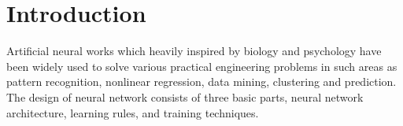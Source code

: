 \section{Introduction}
Artificial neural works which heavily inspired by biology and psychology have been widely used to solve
various practical engineering problems in such areas as pattern recognition, nonlinear regression,
data mining, clustering and prediction.  The design of neural network consists of three basic parts,
neural network architecture, learning rules, and training techniques.


